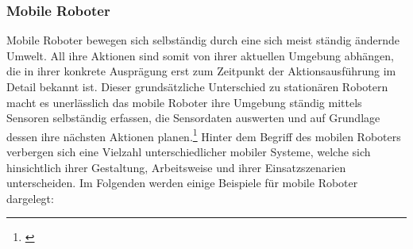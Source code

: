 \subsubsection{Mobile Roboter}
\color{finishing}
Mobile Roboter bewegen sich selbständig durch eine sich meist ständig ändernde Umwelt. All ihre Aktionen sind somit von ihrer aktuellen Umgebung abhängen, die in ihrer konkrete Ausprägung erst zum Zeitpunkt der Aktionsausführung im Detail bekannt ist. 
\newline
Dieser grundsätzliche Unterschied zu stationären Robotern macht es unerlässlich das mobile Roboter ihre Umgebung ständig mittels Sensoren selbständig erfassen, die Sensordaten auswerten und auf Grundlage dessen ihre nächsten Aktionen planen.\footnote{\citep[vgl.][Mobile Roboter, Seite 2]{Hertzberg.MobileRoboter}\label{note3}}
\newline
Hinter dem Begriff des mobilen Roboters verbergen sich eine Vielzahl unterschiedlicher mobiler Systeme, welche
sich hinsichtlich ihrer Gestaltung, Arbeitsweise und ihrer Einsatzszenarien unterscheiden. Im Folgenden werden einige Beispiele für mobile Roboter dargelegt:

